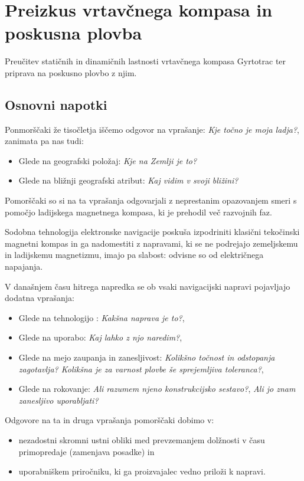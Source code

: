 %
\chapter{Preizkus vrtavčnega kompasa in poskusna plovba}
\label{Vaje:VrtKompas} %

Preučitev statičnih in dinamičnih lastnosti vrtavčnega kompasa Gyrtotrac ter priprava na poskusno plovbo z njim.

\section{Osnovni napotki}
\label{sec:VrtKompas_OsnNap}
Ponmorščaki že tisočletja iščemo odgovor na vprašanje: \textit{Kje točno je moja ladja?}, zanimata pa nas tudi:
\begin{itemize}
	\item Glede na geografski položaj: \textit{Kje na Zemlji je to?}
	\item Glede na bližnji geografski atribut: \textit{Kaj vidim v svoji bližini?} 	
\end{itemize}

Pomorščaki so si na ta vprašanja odgovarjali z neprestanim opazovanjem smeri s pomočjo ladijskega magnetnega kompasa, ki je prehodil več razvojnih faz.

Sodobna tehnologija elektronske navigacije poskuša izpodriniti klasični tekočinski magnetni kompas in ga nadomestiti z napravami, ki se ne podrejajo zemeljskemu in ladijskemu magnetizmu, imajo pa slabost: odvisne so od električnega napajanja. 

V današnjem času hitrega napredka se ob vsaki navigacijski napravi pojavljajo dodatna vprašanja:
\begin{itemize}
	\item Glede na tehnologijo : \textit{Kakšna naprava je to?},
	\item Glede na uporabo: \textit{Kaj lahko z njo naredim?},
	\item Glede na mejo zaupanja in zanesljivost: \textit{Kolikšno točnost in odstopanja zagotavlja? Kolikšna je za varnost plovbe še sprejemljiva toleranca?},
	\item Glede na rokovanje: \textit{Ali razumem njeno konstrukcijsko sestavo?}, \textit{Ali jo znam zanesljivo uporabljati?}
\end{itemize}

Odgovore na ta in druga vprašanja pomorščaki dobimo v:
\begin{itemize}
	\item nezadostni skromni ustni obliki med prevzemanjem dolžnosti v času primopredaje (zamenjava posadke) in
	\item uporabniškem priročniku, ki ga proizvajalec vedno priloži k napravi.
\end{itemize}


